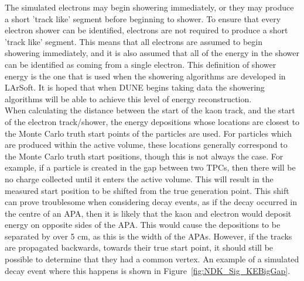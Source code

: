 The simulated electrons may begin showering immediately, or they may produce a short 'track like' segment before beginning to shower. To ensure that every electron shower can be identified, electrons are not required to produce a short 'track like' segment. This means that all electrons are assumed to begin showering immediately, and it is also assumed that all of the energy in the shower can be identified as coming from a single electron. This definition of shower energy is the one that is used when the showering algorithms are developed in LArSoft. It is hoped that when DUNE begins taking data the showering algorithms will be able to achieve this level of energy reconstruction. \\

When calculating the distance between the start of the kaon track, and the start of the electron track/shower, the energy depositions whose locations are closest to the Monte Carlo truth start points of the particles are used. For particles which are produced within the active volume, these locations generally correspond to the Monte Carlo truth start positions, though this is not always the case. For example, if a particle is created in the gap between two TPCs, then there will be no charge collected until it enters the active volume. This will result in the measured start position to be shifted from the true generation point. This shift can prove troublesome when considering decay events, as if the decay occurred in the centre of an APA, then it is likely that the kaon and electron would deposit energy on opposite sides of the APA. This would cause the depositions to be separated by over 5 cm, as this is the width of the APAs. However, if the tracks are propagated backwards, towards their true start point, it should still be possible to determine that they had a common vertex. An example of a simulated decay event where this happens is shown in Figure~\ref{fig:NDK_Sig_KEBigGap}. \\

